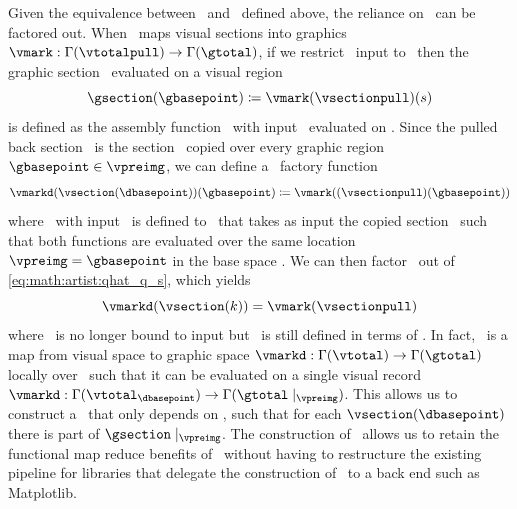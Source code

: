 \documentclass[../main.tex]{subfiles}
\begin{document}
Given the equivalence between \vsection\ and \vsectionpull\ defined above, the reliance on \gbase\ can be factored out. When \vmark\ maps visual sections into graphics $\vmark: \Gamma(\vtotalpull) \rightarrow \Gamma(\gtotal)$, if we restrict \vmark\ input to \vsectionpull\ then the graphic section \gsection\ evaluated on a visual region \gbasepoint\
\begin{equation}
    \gsection(\gbasepoint) \coloneqq \vmark(\vsectionpull)(s)
    \label{eq:math:artist:qhat}
\end{equation}
 is defined as the assembly function \vmark\ with input \vsectionpull\ evaluated on \gbasepoint. Since the pulled back section \vsectionpull\ is the section \vsection\ copied over every graphic region $\gbasepoint \in \vpreimg$, we can define a \vmark\ factory function 
\begin{equation}
\label{eq:math:artist:qhat_q_s}
\vmarkd(\vsection(\dbasepoint))(\gbasepoint) \coloneqq \vmark((\vsectionpull)(\gbasepoint))
\end{equation} 
where \vmarkd\ with input \vsection\ is defined to \vmark\ that takes as input the copied section \vsectionpull\ such that both functions are evaluated over the same location $\vpreimg = \gbasepoint$ in the base space \gbase. We can then factor \gbasepoint\ out of \autoref{eq:math:artist:qhat_q_s}, which yields
\begin{equation}
\vmarkd(\vsection(k)) = \vmark(\vsectionpull)
\label{eq:math:artist:qhat_k}
\end{equation}
where \vmark\ is no longer bound to input but \vmarkd\ is still defined in terms of \dbase. In fact, \vmarkd\ is a map from visual space to graphic space $\vmarkd:\Gamma(\vtotal) \rightarrow \Gamma(\gtotal)$ locally over \dbasepoint\ such that it can be evaluated on a single visual record  $\vmarkd:\Gamma(\vtotal_{\dbasepoint}) \rightarrow \Gamma(\gtotal\mid_{\vpreimg})$. This allows us to construct a \vmarkd\ that only depends on \dbase, such that for each $\vsection(\dbasepoint)$ there is part of $\gsection\mid_{\vpreimg}$. The construction of \vmarkd\ allows us to retain the functional map reduce benefits of \vmark\ without having to restructure the existing pipeline for libraries that delegate the construction of \gsection\ to a back end such as Matplotlib.
\end{document}
